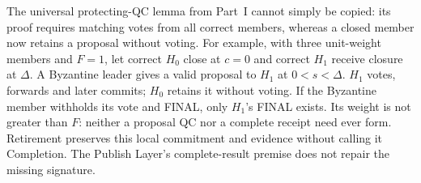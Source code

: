 The universal protecting-QC lemma from Part~I cannot simply be copied:
its proof requires matching votes from all correct members, whereas a
closed member now retains a proposal without voting. For example, with
three unit-weight members and $F=1$, let correct $H_0$ close at $c=0$
and correct $H_1$ receive closure at $\Delta$. A Byzantine leader gives
a valid proposal to $H_1$ at $0<s<\Delta$. $H_1$ votes, forwards and
later commits; $H_0$ retains it without voting. If the Byzantine member
withholds its vote and FINAL, only $H_1$'s FINAL exists. Its weight is
not greater than $F$: neither a proposal QC nor a complete receipt need
ever form. Retirement preserves this local commitment and evidence
without calling it Completion. The Publish Layer's complete-result
premise does not repair the missing signature.
